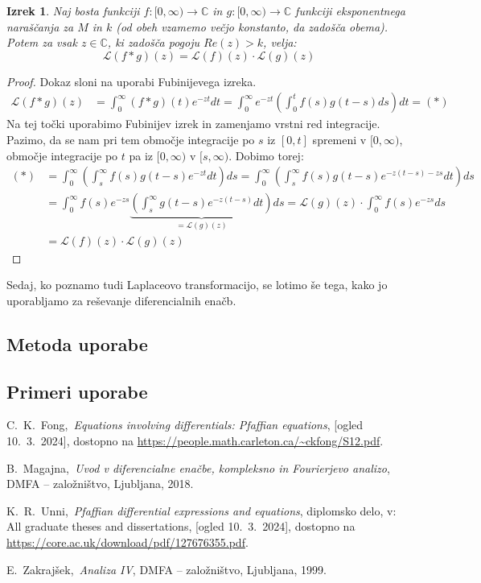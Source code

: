 \documentclass[a4paper, 10pt]{article}
\newtheorem{izr}{Izrek}
\newcommand{\mth}[1]{\ensuremath{\mathbb{#1}}}
\newcommand{\C}{\mth{C}}
\newcommand{\map}[3]{\ensuremath{{#1}: {#2} \rightarrow {#3}}}
\begin{document}
			\begin{izr}
				\label{izr:KonvLT}
				Naj bosta funkciji $\map{f}{[0,\infty)}{\C}$ in $\map{g}{[0,\infty)}{\C}$ funkciji eksponentnega naraščanja za $M$ in $k$ (od obeh vzamemo večjo konstanto, da zadošča obema). Potem za vsak $z\in\C$, ki zadošča pogoju $Re(z) > k$, velja: $$\mathcal{L}(f*g)(z) = \mathcal{L}(f)(z)\cdot\mathcal{L}(g)(z)$$
			\end{izr}
			
			\begin{proof}
				Dokaz sloni na uporabi Fubinijevega izreka. \begin{align*}
					\mathcal{L}(f*g)(z) &= \int_{0}^{\infty}(f*g)(t)e^{-zt}dt = \int_{0}^{\infty}e^{-zt}(\int_{0}^{t}f(s)g(t-s)ds)dt = (*)
				\end{align*}
				Na tej točki uporabimo Fubinijev izrek in zamenjamo vrstni red integracije. Pazimo, da se nam pri tem območje integracije po $s$ iz $[0, t]$ spremeni v $[0, \infty)$, območje integracije po $t$ pa iz $[0, \infty)$ v $[s, \infty)$. Dobimo torej: \begin{align*}
					(*) &= \int_{0}^{\infty}(\int_{s}^{\infty}f(s)g(t-s)e^{-zt}dt)ds =\int_{0}^{\infty}(\int_{s}^{\infty}f(s)g(t-s)e^{-z(t-s) - zs}dt)ds \\
					&= \int_{0}^{\infty}f(s)e^{-zs}\underbrace{(\int_{s}^{\infty}g(t-s)e^{-z(t-s)}dt)}_{=\mathcal{L}(g)(z)}ds = \mathcal{L}(g)(z)\cdot \int_{0}^{\infty}f(s)e^{-zs}ds \\
					&= \mathcal{L}(f)(z)\cdot\mathcal{L}(g)(z)
				\end{align*}
			\end{proof}
			
			Sedaj, ko poznamo tudi Laplaceovo transformacijo, se lotimo še tega, kako jo uporabljamo za reševanje diferencialnih enačb.
		\subsection{Metoda uporabe}
		
		\subsection{Primeri uporabe}
		
	
	\begin{thebibliography}{99}
		
		 C.~K.~Fong,~\emph{Equations involving differentials: Pfaffian equations}, [ogled 10.~3.~2024], dostopno na \url{https://people.math.carleton.ca/~ckfong/S12.pdf}.
		
		 B.~Magajna,~\emph{Uvod v diferencialne enačbe, kompleksno in Fourierjevo analizo}, DMFA -- založništvo, Ljubljana, 2018.
		
		 K.~R.~Unni,~\emph{Pfaffian differential expressions and equations}, diplomsko delo, v: All graduate theses and dissertations, [ogled 10.~3.~2024], dostopno na \url{https://core.ac.uk/download/pdf/127676355.pdf}.
		
		 E.~Zakrajšek,~\emph{Analiza IV}, DMFA -- založništvo, Ljubljana, 1999.
		
	\end{thebibliography}
\end{document}
